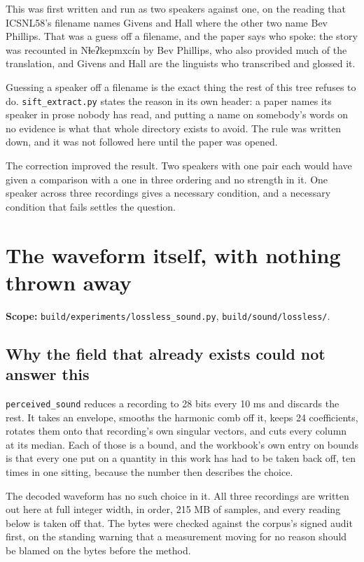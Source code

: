 This was first written and run as two speakers against one, on the reading that ICSNL58's filename
names Givens and Hall where the other two name Bev Phillips. That was a guess off a filename, and
the paper says who spoke: the story was recounted in Nɬeʔkepmxcín by Bev Phillips, who also provided
much of the translation, and Givens and Hall are the linguists who transcribed and glossed it.

Guessing a speaker off a filename is the exact thing the rest of this tree refuses to do.
\texttt{sift\_\allowbreak{}extract.\allowbreak{}py} states the reason in its own header: a paper names
its speaker in prose nobody has read, and putting a name on somebody's words on no evidence is what
that whole directory exists to avoid. The rule was written down, and it was not followed here until
the paper was opened.

The correction improved the result. Two speakers with one pair each would have given a comparison
with a one in three ordering and no strength in it. One speaker across three recordings gives a
necessary condition, and a necessary condition that fails settles the question.

\section{The waveform itself, with nothing thrown away}

\textbf{Scope:} \texttt{build/\allowbreak{}experiments/\allowbreak{}lossless\_\allowbreak{}sound.\allowbreak{}py},
\texttt{build/\allowbreak{}sound/\allowbreak{}lossless/\allowbreak{}}.

\subsection{Why the field that already exists could not answer this}

\texttt{perceived\_\allowbreak{}sound} reduces a recording to 28 bits every 10 ms and discards the
rest. It takes an envelope, smooths the harmonic comb off it, keeps 24 coefficients, rotates them
onto that recording's own singular vectors, and cuts every column at its median. Each of those is a
bound, and the workbook's own entry on bounds is that every one put on a quantity in this work has had
to be taken back off, ten times in one sitting, because the number then describes the choice.

The decoded waveform has no such choice in it. All three recordings are written out here at full
integer width, in order, 215 MB of samples, and every reading below is taken off that. The bytes were
checked against the corpus's signed audit first, on the standing warning that a measurement moving
for no reason should be blamed on the bytes before the method.

